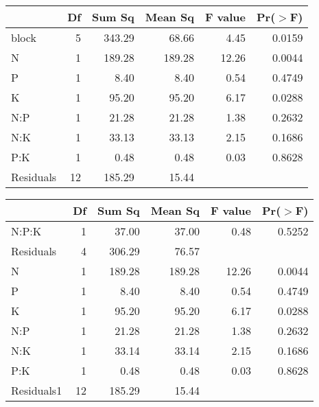 \begin{table}[ht]
\begin{center}
\begin{tabular}{lrrrrr}
  \hline
 & Df & Sum Sq & Mean Sq & F value & Pr($>$F) \\ 
  \hline
block       & 5 & 343.29 & 68.66 & 4.45 & 0.0159 \\ 
  N           & 1 & 189.28 & 189.28 & 12.26 & 0.0044 \\ 
  P           & 1 & 8.40 & 8.40 & 0.54 & 0.4749 \\ 
  K           & 1 & 95.20 & 95.20 & 6.17 & 0.0288 \\ 
  N:P         & 1 & 21.28 & 21.28 & 1.38 & 0.2632 \\ 
  N:K         & 1 & 33.13 & 33.13 & 2.15 & 0.1686 \\ 
  P:K         & 1 & 0.48 & 0.48 & 0.03 & 0.8628 \\ 
  Residuals   & 12 & 185.29 & 15.44 &  &  \\ 
   \hline
\end{tabular}
\end{center}
\end{table}
\begin{table}[ht]
\begin{center}
\begin{tabular}{lrrrrr}
  \hline
 & Df & Sum Sq & Mean Sq & F value & Pr($>$F) \\ 
  \hline
N:P:K     & 1 & 37.00 & 37.00 & 0.48 & 0.5252 \\ 
  Residuals & 4 & 306.29 & 76.57 &  &  \\ 
  N         & 1 & 189.28 & 189.28 & 12.26 & 0.0044 \\ 
  P         & 1 & 8.40 & 8.40 & 0.54 & 0.4749 \\ 
  K         & 1 & 95.20 & 95.20 & 6.17 & 0.0288 \\ 
  N:P       & 1 & 21.28 & 21.28 & 1.38 & 0.2632 \\ 
  N:K       & 1 & 33.14 & 33.14 & 2.15 & 0.1686 \\ 
  P:K       & 1 & 0.48 & 0.48 & 0.03 & 0.8628 \\ 
  Residuals1 & 12 & 185.29 & 15.44 &  &  \\ 
   \hline
\end{tabular}
\end{center}
\end{table}
